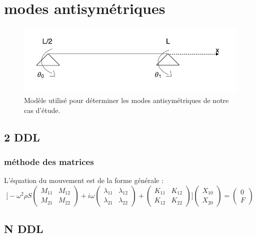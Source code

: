\documentclass[a4paper,10pt]{report} %
\begin{document}
\section{modes antisymétriques}

\begin{figure}[H]
\begin{center}
	\includegraphics[width=1\textwidth]{schemamodeantisym.png} 
\end{center} 
\caption{Modèle utilisé pour déterminer les modes antisymétriques de notre cas d'étude.}
\end{figure}

\subsection{2 DDL}
\subsubsection{méthode des matrices}

L'équation du mouvement est de la forme générale :
$$ \Bigg[
- \omega^2 \rho S \begin{pmatrix}
   M_{11} & M_{12} \\
   M_{21} & M_{22} 
\end{pmatrix}
+ i \omega \begin{pmatrix}
	\lambda_{11} & \lambda_{12} \\
	\lambda_{21} & \lambda_{22}
\end{pmatrix}
+ \begin{pmatrix}
	K_{11} & K_{12} \\
	K_{12} & K_{22}
\end{pmatrix} \Bigg]
\begin{pmatrix}
	X_{10} \\
	X_{20}
\end{pmatrix}
= \begin{pmatrix}
	0 \\
	F
\end{pmatrix}
$$


\subsection{N DDL}
\end{document}
